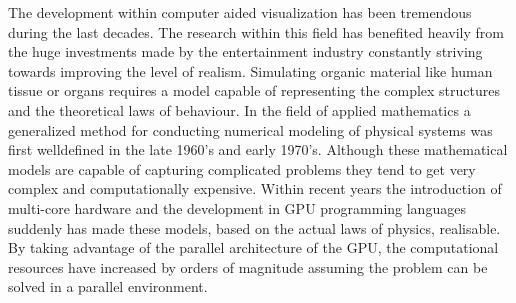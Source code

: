 %
The development within computer aided visualization has been
tremendous during the last decades. The research within this field
has benefited heavily from the huge investments made by the
entertainment industry constantly striving towards improving the level
of realism. 
%
Simulating organic material like human tissue or organs requires a
model capable of representing the complex structures and
the theoretical laws of behaviour. 
%
In the field of applied mathematics a generalized method for
conducting numerical modeling of physical systems was first
welldefined in the late 1960's and early 1970's. 
%
Although these mathematical models are capable of capturing
complicated problems they tend to get very complex and computationally
expensive.
%
Within recent years the introduction of multi-core hardware and the
development in GPU programming languages suddenly has made these
models, based on the actual laws of physics, realisable. By taking
advantage of the parallel architecture of the GPU, the computational
resources have increased by orders of magnitude assuming the problem
can be solved in a parallel environment. \\

%
%

%

